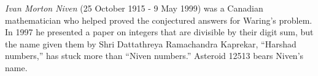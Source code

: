 \documentclass[12pt]{article}
\begin{document}
{\em Ivan Morton Niven} (25 October 1915 - 9 May 1999) was a Canadian mathematician who helped proved the conjectured answers for Waring's problem. In 1997 he presented a paper on integers that are divisible by their digit sum, but the name given them by Shri Dattathreya Ramachandra Kaprekar, ``Harshad numbers,'' has stuck more than ``Niven numbers.'' Asteroid 12513 bears Niven's name.
\end{document}
